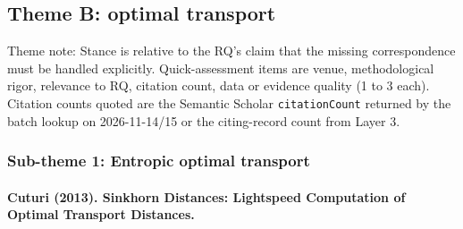 \documentclass[journal,onecolumn]{IEEEtran}
\begin{document}
\subsection{Theme B: optimal transport}

Theme note: Stance is relative to the RQ's claim that the missing correspondence must be handled explicitly. Quick-assessment items are venue, methodological rigor, relevance to RQ, citation count, data or evidence quality (1 to 3 each). Citation counts quoted are the Semantic Scholar \texttt{citationCount} returned by the batch lookup on 2026-11-14/15 or the citing-record count from Layer 3.

\subsubsection{Sub-theme 1: Entropic optimal transport}

\paragraph{Cuturi (2013). Sinkhorn Distances: Lightspeed Computation of Optimal Transport Distances.~\cite{Cuturi2013Sinkhorn}}\mbox{}
\end{document}
